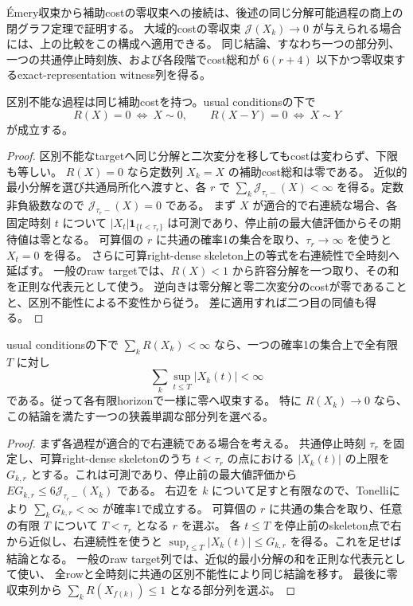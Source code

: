 Émery収束から補助costの零収束への接続は、後述の同じ分解可能過程の商上の閉グラフ定理で証明する。
大域的costの零収束 $\mathcal J(X_k)\to0$ が与えられる場合には、上の比較をこの構成へ適用できる。
同じ結論、すなわち一つの部分列、一つの共通停止時刻族、および各段階でcost総和が
$6(r+4)$ 以下かつ零収束するexact-representation witness列を得る。
\begin{lemma}[補助costの分離性]
区別不能な過程は同じ補助costを持つ。usual conditionsの下で
\[
 R(X)=0\ \Longleftrightarrow\ X\sim0,
 \qquad R(X-Y)=0\ \Longleftrightarrow\ X\sim Y
\]
が成立する。
\end{lemma}
\begin{proof}
区別不能なtargetへ同じ分解と二次変分を移してもcostは変わらず、下限も等しい。
$R(X)=0$ なら定数列 $X_k=X$ の補助cost総和は零である。
近似的最小分解を選び共通局所化へ渡すと、各 $r$ で
$\sum_k\mathcal J_{\tau_r-}(X)<\infty$ を得る。定数非負級数なので
$\mathcal J_{\tau_r-}(X)=0$ である。
まず $X$ が適合的で右連続な場合、各固定時刻 $t$ について
$|X_t|\mathbf1_{\{t<\tau_r\}}$ は可測であり、停止前の最大値評価からその期待値は零となる。
可算個の $r$ に共通の確率1の集合を取り、$\tau_r\to\infty$ を使うと $X_t=0$ を得る。
さらに可算right-dense skeleton上の等式を右連続性で全時刻へ延ばす。
一般のraw targetでは、$R(X)<1$ から許容分解を一つ取り、その和を正則な代表元として使う。
逆向きは零分解と零二次変分のcostが零であることと、区別不能性による不変性から従う。
差に適用すれば二つ目の同値も得る。
\end{proof}
\begin{lemma}[補助costの和可能性と経路的一様収束]
usual conditionsの下で $\sum_k R(X_k)<\infty$ なら、一つの確率1の集合上で全有限 $T$ に対し
\[
 \sum_k\sup_{t\le T}|X_k(t)|<\infty
\]
である。従って各有限horizonで一様に零へ収束する。
特に $R(X_k)\to0$ なら、この結論を満たす一つの狭義単調な部分列を選べる。
\end{lemma}
\begin{proof}
まず各過程が適合的で右連続である場合を考える。
共通停止時刻 $\tau_r$ を固定し、可算right-dense skeletonのうち $t<\tau_r$ の点における
$|X_k(t)|$ の上限を $G_{k,r}$ とする。これは可測であり、停止前の最大値評価から
$E G_{k,r}\le6\mathcal J_{\tau_r-}(X_k)$ である。
右辺を $k$ について足すと有限なので、Tonelliにより $\sum_kG_{k,r}<\infty$ が確率1で成立する。
可算個の $r$ に共通の集合を取り、任意の有限 $T$ について $T<\tau_r$ となる $r$ を選ぶ。
各 $t\le T$ を停止前のskeleton点で右から近似し、右連続性を使うと
$\sup_{t\le T}|X_k(t)|\le G_{k,r}$ を得る。これを足せば結論となる。
一般のraw target列では、近似的最小分解の和を正則な代表元として使い、
全rowと全時刻に共通の区別不能性により同じ結論を移す。
最後に零収束列から $\sum_kR(X_{f(k)})\le1$ となる部分列を選ぶ。
\end{proof}
